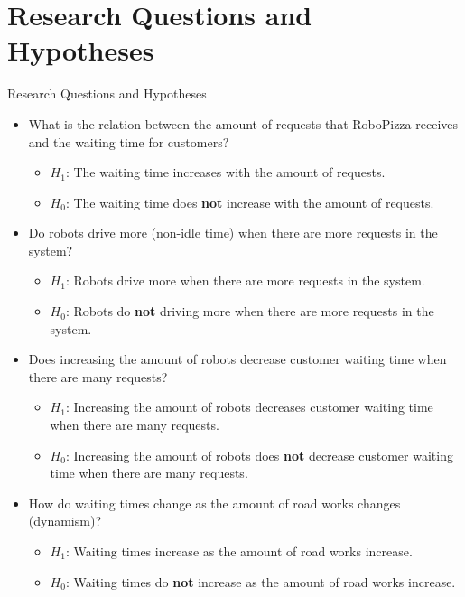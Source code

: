 \section{Research Questions and Hypotheses}

\begin{frame}[allowframebreaks]{Research Questions and Hypotheses}
    \begin{itemize}
        \item What is the relation between the amount of requests that RoboPizza receives and the waiting time for customers?
        \begin{itemize}
                \item $H_1$: The waiting time increases with the amount of requests.
                \item $H_0$: The waiting time does \textbf{not} increase with the amount of requests.
        \end{itemize}

        \item Do robots drive more (non-idle time) when there are more requests in the system?
        \begin{itemize}
                \item $H_1$: Robots drive more when there are more requests in the system.
                \item $H_0$: Robots do \textbf{not} driving more when there are more requests in the system.
        \end{itemize}

        \framebreak

        \item Does increasing the amount of robots decrease customer waiting time when there are many requests?
        \begin{itemize}
                \item $H_1$: Increasing the amount of robots decreases customer waiting time when there are many requests.
                \item $H_0$: Increasing the amount of robots does \textbf{not} decrease customer waiting time when there are many requests.
        \end{itemize}

        \item How do waiting times change as the amount of road works changes (dynamism)?
        \begin{itemize}
            \item $H_1$: Waiting times increase as the amount of road works increase.
            \item $H_0$: Waiting times do \textbf{not} increase as the amount of road works increase.
        \end{itemize}
    \end{itemize}
\end{frame}
